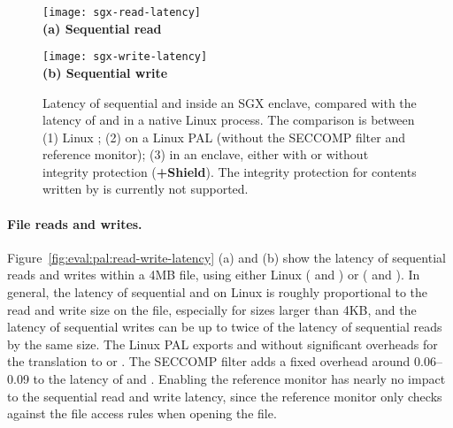 \begin{figure*}[t!]
\centering
\footnotesize
\begin{minipage}{.49\linewidth}
\centering
\texttt{[image: sgx-read-latency]}\\
{\bf (a) Sequential read}
\vspace{6pt}
\end{minipage}
\begin{minipage}{.49\linewidth}
\centering
\texttt{[image: sgx-write-latency]}\\
{\bf (b) Sequential write}
\vspace{6pt}
\end{minipage}
\caption{Latency of sequential  and  inside an SGX enclave, compared with the latency of  and  \linuxapis{} in a native Linux process. The comparison is between (1) Linux \linuxapis{}; (2) \hostapis{} on a Linux PAL (without the SECCOMP filter and reference monitor); (3) \hostapis{} in an enclave, either with or without integrity protection ({\bf +Shield}).
The integrity protection for contents written by 
is currently not supported.}
\label{fig:eval:pal:sgx-read-write-latency}
\end{figure*}


\paragraph{File reads and writes.}
Figure~\ref{fig:eval:pal:read-write-latency} (a) and (b) show the latency of sequential reads and writes within a 4MB file, using either Linux \linuxapis{} ( and )
or \hostapis{} ( and ).
In general, the latency of sequential  and 
\linuxapis{} on Linux
is roughly proportional to the read and write size on the file,
especially for sizes larger than 4KB, and the latency of sequential writes can be up to twice of the latency of sequential reads by the same size. 
The Linux PAL exports  and 
without significant overheads
for the translation to  or  \linuxapis{}.
The SECCOMP filter adds a fixed overhead around 0.06--0.09 \msec{} to the latency of  and .
Enabling the reference monitor has nearly no impact to the sequential read and write latency,
since the reference monitor only checks against the file access rules
when opening the file.
 

